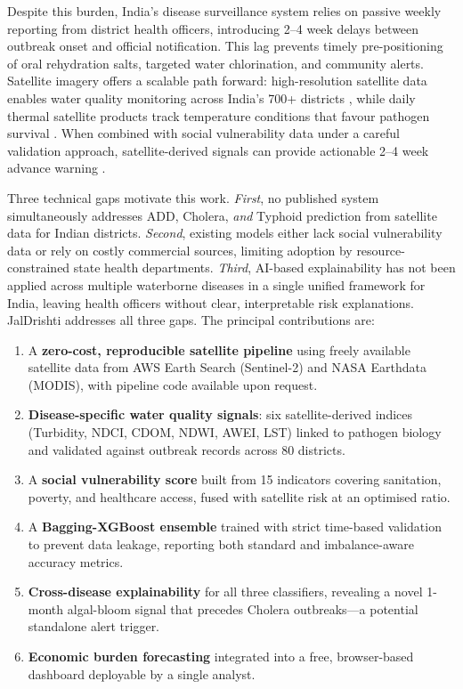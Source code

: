 \documentclass[conference]{IEEEtran}
\begin{document}
Despite this burden, India's disease surveillance system relies on passive
weekly reporting from district health officers, introducing 2--4 week
delays between outbreak onset and official notification. This lag prevents
timely pre-positioning of oral rehydration salts, targeted water
chlorination, and community alerts. Satellite imagery offers a scalable
path forward: high-resolution satellite data enables water quality
monitoring across India's 700+ districts \cite{gu2020,ma2021}, while
daily thermal satellite products track temperature conditions that favour
pathogen survival \cite{campbell2020}. When combined with social
vulnerability data under a careful validation approach, satellite-derived
signals can provide actionable 2--4 week advance warning
\cite{nusrat2024,hussain2023}.

Three technical gaps motivate this work. \emph{First}, no published system
simultaneously addresses ADD, Cholera, \emph{and} Typhoid prediction from
satellite data for Indian districts. \emph{Second}, existing models either
lack social vulnerability data or rely on costly commercial sources,
limiting adoption by resource-constrained state health departments.
\emph{Third}, AI-based explainability has not been applied across
multiple waterborne diseases in a single unified framework for India,
leaving health officers without clear, interpretable risk explanations.
JalDrishti addresses all three gaps. The principal contributions are:

\begin{enumerate}
\item A \textbf{zero-cost, reproducible satellite pipeline} using freely
  available satellite data from AWS Earth Search (Sentinel-2) and NASA
  Earthdata (MODIS), with pipeline code available upon request.
\item \textbf{Disease-specific water quality signals}: six
  satellite-derived indices (Turbidity, NDCI, CDOM, NDWI, AWEI, LST)
  linked to pathogen biology and validated against outbreak records
  across 80 districts.
\item A \textbf{social vulnerability score} built from 15 indicators
  covering sanitation, poverty, and healthcare access, fused with
  satellite risk at an optimised ratio.
\item A \textbf{Bagging-XGBoost ensemble} trained with strict
  time-based validation to prevent data leakage, reporting both
  standard and imbalance-aware accuracy metrics.
\item \textbf{Cross-disease explainability} for all three classifiers,
  revealing a novel 1-month algal-bloom signal that precedes Cholera
  outbreaks---a potential standalone alert trigger.
\item \textbf{Economic burden forecasting} integrated into a
  free, browser-based dashboard deployable by a single analyst.
\end{enumerate}
\end{document}
